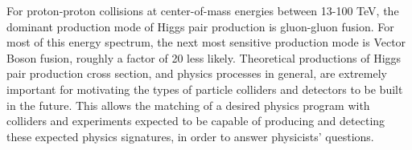 For proton-proton collisions at center-of-mass energies between 13-100 TeV, the dominant production mode of Higgs pair production is gluon-gluon fusion. For most of this energy spectrum, the next most sensitive production mode is Vector Boson fusion, roughly a factor of 20 less likely. Theoretical productions of Higgs pair production cross section, and physics processes in general, are extremely important for motivating the types of particle colliders and detectors to be built in the future. This allows the matching of a desired physics program with colliders and experiments expected to be capable of producing and detecting these expected physics signatures, in order to answer physicists' questions. 